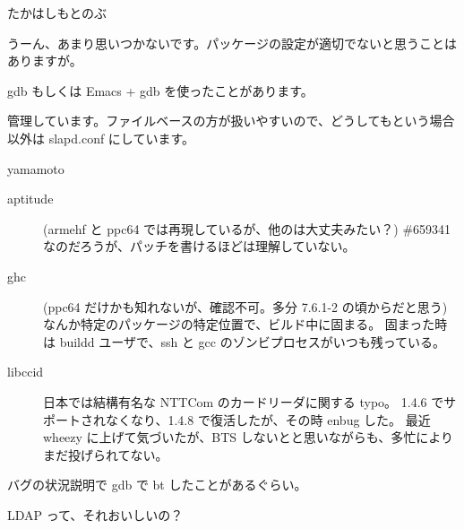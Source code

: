 \begin{prework}{ たかはしもとのぶ }


 うーん、あまり思いつかないです。パッケージの設定が適切でないと思うことはありますが。

  gdb もしくは Emacs + gdb を使ったことがあります。

  管理しています。ファイルベースの方が扱いやすいので、どうしてもという場合以外は slapd.conf にしています。
\end{prework}

\begin{prework}{ yamamoto }


\begin{description}
\item [aptitude] (armehf と ppc64 では再現しているが、他のは大丈夫みたい？)
\#659341 なのだろうが、パッチを書けるほどは理解していない。

\item [ghc] (ppc64 だけかも知れないが、確認不可。多分 7.6.1-2 の頃からだと思う)
なんか特定のパッケージの特定位置で、ビルド中に固まる。
固まった時は buildd ユーザで、ssh と gcc のゾンビプロセスがいつも残っている。

\item [libccid] 日本では結構有名な NTTCom のカードリーダに関する typo。
1.4.6 でサポートされなくなり、1.4.8 で復活したが、その時 enbug した。
最近 wheezy に上げて気づいたが、BTS しないとと思いながらも、多忙によりまだ投げられてない。
\end{description}

バグの状況説明で gdb で bt したことがあるぐらい。

LDAP って、それおいしいの？
\end{prework}

